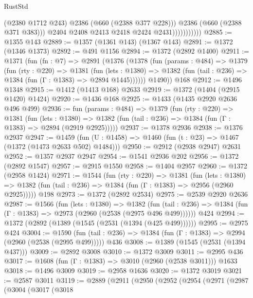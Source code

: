 \begin{lexlean}{RustStd}
\begin{coremodule}
                              (@2380 @1712 @243)
                              @2386
                              (@660 (@2388 @377 @228)))
                            @2386
                            (@660 (@2388 @371 @383)))
                          @2404
                          @2408
                          @2413
                          @2418
                          @2424
                          @2431)))))))))))
@2885 := @1355 @143
@2889 := @1357 (@1361 @143) (@1367 @143)
@2891 := @1372 (@1346 @1373)
@2892 := @491 @1156
@2894 := @1372 (@2892 @1400)
@2911 := @1371
    (fun (fn : @7) =>
    @2891
      (@1376
        (@1378
          (fun (params : @484) =>
          @1379
            (fun (rty : @220) =>
            @1381
              (fun (lets : @1380) =>
              @1382 (fun (tail : @236) => @1384 (fun (Γ : @1383) => @2894 @1445))))))
        @1490))
    @168
@2912 := @1496 @1348
@2915 := @1412 (@1413 @168) @2633
@2919 := @1372 (@1404 (@2915 @1420) @1424)
@2920 := @1436 @168
@2925 := @1433 (@1435 @2920 @2636 @496 @499)
@2936 := fun (params : @484) =>
  @1379
    (fun (rty : @220) =>
    @1381
      (fun (lets : @1380) =>
      @1382 (fun (tail : @236) => @1384 (fun (Γ : @1383) => @2894 (@2919 @2925)))))
@2937 := @1378 @2936
@2938 := @1376 @2937
@2947 := @1459 (fun (U : @1458) => @1460 (fun (t : @23) => @1467 (@1372 (@1473 @2633 @502) @1484)))
@2950 := @2912 (@2938 @2947) @2631
@2952 := @1357 @2937 @2947
@2954 := @1541 @2936 @202
@2956 := @1372 (@2892 @1547)
@2957 := @2915 @1550
@2958 := @1404 @2957
@2960 := @1372 (@2958 @1424)
@2971 := @1544
    (fun (rty : @220) =>
    @1381
      (fun (lets : @1380) =>
      @1382 (fun (tail : @236) => @1384 (fun (Γ : @1383) => @2956 (@2960 @2925)))))
    @198
@2973 := @1372 (@2892 @2534)
@2975 := @2539 @2920 @2636
@2987 := @1566
    (fun (lets : @1380) =>
    @1382 (fun (tail : @236) => @1384 (fun (Γ : @1383) => @2973 (@2960 (@2538 (@2975 @496 @499))))))
    @424
@2994 := @1372 (@2892 (@1389 (@1545 (@2531 (@1394 (@425 @499))))))
@2995 := @2975 @424
@3004 := @1590
    (fun (tail : @236) => @1384 (fun (Γ : @1383) => @2994 (@2960 (@2538 (@2995 @499)))))
    @436
@3008 := @1389 (@1545 (@2531 (@1394 @437)))
@3009 := @2892 @3008
@3010 := @1372 @3009
@3011 := @2995 @436
@3017 := @1608 (fun (Γ : @1383) => @3010 (@2960 (@2538 @3011))) @1633
@3018 := @1496 @3009
@3019 := @2958 @1636
@3020 := @1372 @3019
@3021 := @2587 @3011
@3119 := @2889
    (@2911
      (@2950
        (@2952
          (@2954
            (@2971
              (@2987
                (@3004
                  (@3017
                    (@3018

\end{coremodule}
\end{lexlean}
